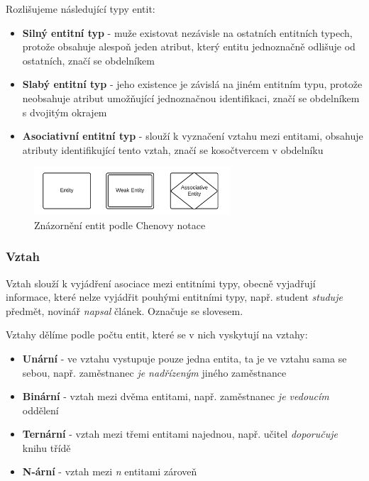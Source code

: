 \documentclass[czech,bachelor,public,dept460,male,oneside]{diploma}
\begin{document}
	Rozlišujeme následující typy entit:

	\begin{itemize}
		\item \textbf{Silný entitní typ} - muže existovat nezávisle na ostatních entitních typech, protože obsahuje alespoň jeden atribut, který entitu jednoznačně odlišuje od ostatních, značí se obdelníkem
		
		\item \textbf{Slabý entitní typ} - jeho existence je závislá na jiném entitním typu, protože neobsahuje atribut umožňující jednoznačnou identifikaci, značí se obdelníkem s dvojitým okrajem
		
		\item \textbf{Asociativní entitní typ} - slouží k vyznačení vztahu mezi entitami, obsahuje atributy identifikující tento vztah, značí se kosočtvercem v obdelníku
	\end{itemize}

	\begin{figure}[!h]
		\centering
		\includegraphics[width=0.65\textwidth]{Figures/ChenEntities}
		\caption{Znázornění entit podle Chenovy notace}
	\end{figure}

	\subsubsection{Vztah}
	Vztah slouží k vyjádření asociace mezi entitními typy, obecně vyjadřují informace, které nelze vyjádřit pouhými entitními typy, např. student \textit{studuje} předmět, novinář \textit{napsal} článek. Označuje se slovesem.
	
	Vztahy dělíme podle počtu entit, které se v nich vyskytují na vztahy:
	
	\begin{itemize}
		\item \textbf{Unární} - ve vztahu vystupuje pouze jedna entita, ta je ve vztahu sama se sebou, např. zaměstnanec \textit{je nadřízeným} jiného zaměstnance
		\item \textbf{Binární} - vztah mezi dvěma entitami, např. zaměstnanec \textit{je vedoucím} oddělení
		\item \textbf{Ternární} - vztah mezi třemi entitami najednou, např. učitel \textit{doporučuje} knihu třídě
		\item \textbf{N-ární} - vztah mezi \textit{n} entitami zároveň
	\end{itemize}
	
\end{document}
